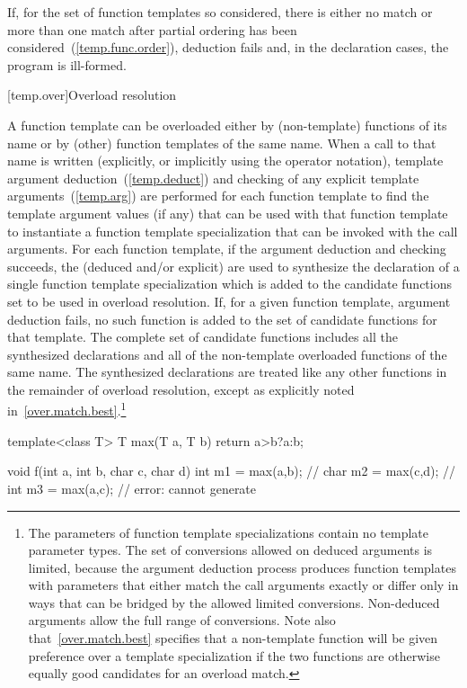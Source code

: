 \pnum
If, for the set of function templates so considered, there is either no match or
more than one match after partial ordering has been considered~(\ref{temp.func.order}),
deduction fails and, in the declaration cases, the
program is ill-formed.

[temp.over]{Overload resolution}

\pnum
{}%
A function template can be overloaded either by (non-template) functions of its
name or by (other) function templates of the same name.
When a call to that name is written (explicitly, or implicitly using the
operator notation), template argument deduction~(\ref{temp.deduct})
and checking of any explicit template arguments~(\ref{temp.arg}) are performed
for each function template to find the template argument values (if any) that
can be used with that function template to instantiate a function template
specialization that can be invoked with the call arguments.
For each function template, if the argument deduction and checking succeeds,
the
(deduced and/or explicit)
are used to synthesize the declaration of
a single function template specialization which is
added to the candidate functions set to be used in overload resolution.
If, for a given function template, argument deduction fails, no such function
is added to the set of candidate functions for that template.
The complete set of candidate functions includes all the synthesized
declarations and all of the non-template overloaded functions of
the same name.
The synthesized declarations are
treated like any other functions in
the remainder of overload resolution, except as explicitly noted
in~\ref{over.match.best}.\footnote{The parameters of function template
specializations contain no
template parameter types.
The set of conversions allowed on deduced arguments is limited, because the
argument deduction process produces function templates with parameters that
either match the call arguments exactly or differ only in ways that can be
bridged by the allowed limited conversions.
Non-deduced arguments allow the full range of conversions.
Note also that~\ref{over.match.best} specifies that a non-template function will
be given preference over a template specialization if the two functions
are otherwise equally good candidates for an overload match.}

\enterexample
\begin{codeblock}
template<class T> T max(T a, T b) { return a>b?a:b; }

void f(int a, int b, char c, char d) {
  int m1 = max(a,b);            // 
  char m2 = max(c,d);           // 
  int m3 = max(a,c);            // error: cannot generate 
}
\end{codeblock}

